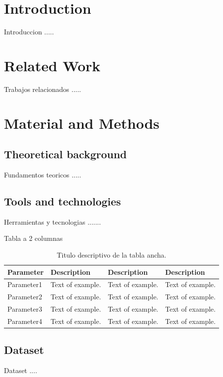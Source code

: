 \documentclass[5p]{elsarticle}
\begin{document}
\section{Introduction}
\label{sec:introduction}
Introduccion .....

\section{Related Work}
\label{sec:related_work}
Trabajos relacionados .....

\section{Material and Methods}
\label{sec:material_methods}

\subsection{Theoretical background}
\label{sec:theoretical_background}
Fundamentos teoricos .....

\subsection{Tools and technologies}
\label{sec:tools_technologies}
Herramientas y tecnologias .......

Tabla a 2 columnas
\begin{table}[htbp]
  \caption{Titulo descriptivo de la tabla ancha.}
  \label{tab:table1}
  \centering
  \begin{tabular}{p{} p{} p{} p{}}
   \hline
    \textbf{Parameter} & \textbf{Description} & \textbf{Description} & \textbf{Description} \\
    \hline
    Parameter1 & Text of example. & Text of example. & Text of example. \\
    Parameter2 & Text of example. & Text of example. & Text of example. \\
    Parameter3 & Text of example. & Text of example. & Text of example. \\
    Parameter4 & Text of example. & Text of example. & Text of example. \\
    \hline
  \end{tabular}
\end{table}

\subsection{Dataset}
\label{sec:dataset}
Dataset ....
\end{document}
